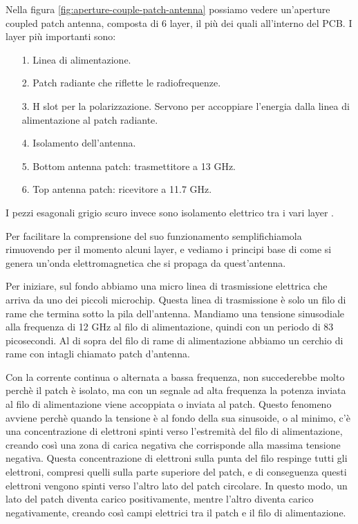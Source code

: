 Nella figura \ref{fig:aperture-couple-patch-antenna} possiamo vedere un'aperture coupled patch antenna, composta di 6 layer, il più dei quali all'interno del PCB.
I layer più importanti sono:
\begin{itemize}
  \item[1.] Linea di alimentazione.
  \item[2.] Patch radiante che riflette le radiofrequenze.
  \item[3.] H slot per la polarizzazione. Servono per accoppiare l'energia dalla linea di alimentazione al patch radiante.
  \item[4.] Isolamento dell'antenna.
  \item[5.] Bottom antenna patch: trasmettitore a 13 GHz.
  \item[6.] Top antenna patch: ricevitore a 11.7 GHz.
\end{itemize}
I pezzi esagonali grigio scuro invece sono isolamento elettrico tra i vari layer \cite{branch_education_how_2022}.

Per facilitare la comprensione del suo funzionamento semplifichiamola rimuovendo per il momento alcuni layer, e vediamo i principi base di come si genera un'onda elettromagnetica che si propaga da quest'antenna.

Per iniziare, sul fondo abbiamo una micro linea di trasmissione elettrica che arriva da uno dei piccoli microchip.
Questa linea di trasmissione è solo un filo di rame che termina sotto la pila dell'antenna.
Mandiamo una tensione sinusodiale alla frequenza di 12 GHz al filo di alimentazione, quindi con un periodo di 83 picosecondi.
Al di sopra del filo di rame di alimentazione abbiamo un cerchio di rame con intagli chiamato patch d'antenna.

Con la corrente continua o alternata a bassa frequenza, non succederebbe molto perchè il patch è isolato, ma con un segnale ad alta frequenza la potenza inviata al filo di alimentazione viene accoppiata o inviata al patch.
Questo fenomeno avviene perchè quando la tensione è al fondo della sua sinusoide, o al minimo, c'è una concentrazione di elettroni spinti verso l'estremità del filo di alimentazione, creando così una zona di carica negativa che corrisponde alla massima tensione negativa.
Questa concentrazione di elettroni sulla punta del filo respinge tutti gli elettroni, compresi quelli sulla parte superiore del patch, e di conseguenza questi elettroni vengono spinti verso l'altro lato del patch circolare.
In questo modo, un lato del patch diventa carico positivamente, mentre l'altro diventa carico negativamente, creando così campi elettrici tra il patch e il filo di alimentazione.

